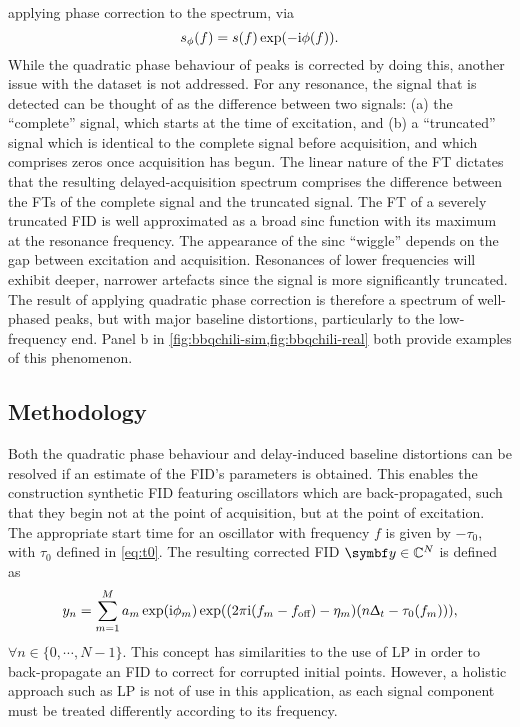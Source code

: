 applying phase correction to the spectrum, via
\begin{equation}
    s_{\phi}(f) = s(f) \exp(-\mathrm{i} \phi(f)).
        \label{eq:spec-phase-chili}
\end{equation}
While the quadratic phase behaviour of peaks is corrected by doing this,
another issue with the dataset is not addressed.
For any resonance, the signal that is detected can be thought of as
the difference between two signals: (a) the ``complete'' signal, which starts
at the time of excitation, and (b) a ``truncated'' signal which is identical to
the complete signal before acquisition, and which comprises zeros once
acquisition has begun. The linear nature of the \ac{FT} dictates that the
resulting delayed-acquisition spectrum comprises the difference between the
\acp{FT} of the complete signal and the truncated signal.  The \ac{FT} of a
severely
truncated \ac{FID} is well approximated as a broad sinc function with its maximum
at the resonance frequency. The appearance of the sinc ``wiggle'' depends on
the gap between excitation and acquisition. Resonances of lower
frequencies will exhibit deeper, narrower artefacts since the signal is more
significantly truncated. The result of applying quadratic phase correction is
therefore a spectrum of well-phased peaks, but with major baseline distortions,
particularly to the low-frequency end. Panel b in
\cref{fig:bbqchili-sim,fig:bbqchili-real} both provide examples of this
phenomenon.

\subsection{Methodology}
Both the quadratic phase behaviour and delay-induced baseline distortions can
be resolved if an estimate of the \ac{FID}'s parameters is obtained. This enables
the construction synthetic \ac{FID} featuring oscillators which are back-propagated,
such that they begin not at the point of acquisition, but at the point of
excitation. The appropriate start time for an oscillator with frequency $f$
is given by $-\tau_0$, with $\tau_0$ defined in \cref{eq:t0}. The
resulting corrected \ac{FID} $\by \in \mathbb{C}^N$ is defined as
\begin{equation}
    y_n = \sum_{m=1}^{M} a_m \exp(\mathrm{i} \phi_m) \exp((2 \pi \mathrm{i} (f_m - f_{\text{off}}) - \eta_m) (n \Updelta_t - \tau_0(f_m))),
    \label{eq:backprop}
\end{equation}
$\forall n \in \lbrace 0, \cdots, N-1 \rbrace$.
This concept has similarities to the use of \ac{LP} in order to back-propagate
an \ac{FID} to correct for corrupted initial points. However, a holistic
approach such as \ac{LP} is not of use in this application, as each signal
component must be treated differently according to its frequency.

